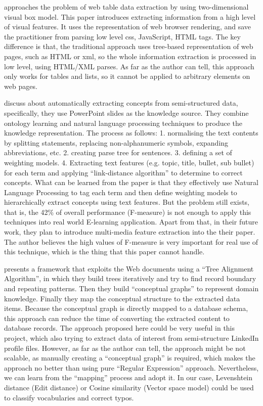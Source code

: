 
\cite{gatterbauer2007} approaches the problem of web table data extraction by using two-dimensional visual box model. This paper introduces extracting information from a high level of visual features. It uses the representation of web browser rendering, and save the practitioner from parsing low level \gls{css}, JavaScript, HTML tags. The key difference is that, the traditional approach uses tree-based representation of web pages, such as HTML or \gls{xml}, so the whole information extraction is processed in low level, using HTML/XML parses. As far as the author can tell, this approach only works for tables and lists, so it cannot be applied to arbitrary elements on web pages.

\cite{atapattu2012} discuss about automatically extracting concepts from semi-structured data, specifically, they use PowerPoint slides as the knowledge source. They combine ontology learning and natural language processing techniques to produce the knowledge representation. The process as follows: 1. normalising the text contents by splitting statements, replacing non-alphanumeric symbols, expanding abbreviations, etc. 2. creating parse tree for sentences. 3. defining a set of weighting models. 4. Extracting text features (e.g. topic, title, bullet, sub bullet) for each term and applying ``link-distance algorithm'' to determine to correct concepts. What can be learned from the paper is that they effectively use Natural Language Processing to tag each term and then define weighting models to hierarchically extract concepts using text features. But the problem still exists, that is, the 42\% of overall performance (F-measure) is not enough to apply this techniques into real world E-learning application. Apart from that, in their future work, they plan to introduce multi-media feature extraction into the their paper. The author believes the high values of F-measure is very important for real use of this technique, which is the thing that this paper cannot handle.

\cite{hemnani2002} presents a framework that exploits the Web documents using a ``Tree Alignment Algorithm'', in which they build trees iteratively and try to find record boundary and repeating patterns. Then they build ``conceptual graphs'' to represent domain knowledge. Finally they map the conceptual structure to the extracted data items. Because the conceptual graph is directly mapped to a database schema, this approach can reduce the time of converting the extracted content to database records. The approach proposed here could be very useful in this project, which also trying to extract data of interest from semi-structure LinkedIn profile files. However, as far as the author can tell, the approach might be not scalable, as manually creating a ``conceptual graph'' is required, which makes the approach no better than using pure ``Regular Expression'' approach. Nevertheless, we can learn from the ``mapping'' process and adopt it. In our case, Levenshtein distance (Edit distance) or Cosine similarity (Vector space model) could be used to classify vocabularies and correct typos. 

